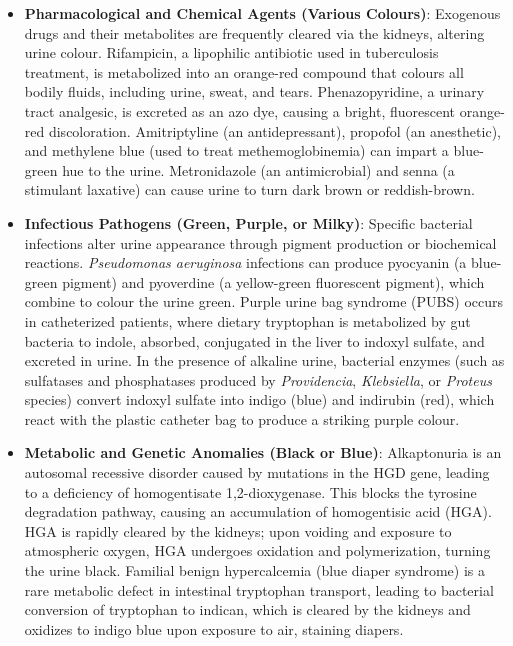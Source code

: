 \begin{itemize}
  \item \textbf{Pharmacological and Chemical Agents (Various Colours)}: Exogenous drugs and their metabolites are frequently cleared via the kidneys, altering urine colour. Rifampicin, a lipophilic antibiotic used in tuberculosis treatment, is metabolized into an orange-red compound that colours all bodily fluids, including urine, sweat, and tears. Phenazopyridine, a urinary tract analgesic, is excreted as an azo dye, causing a bright, fluorescent orange-red discoloration. Amitriptyline (an antidepressant), propofol (an anesthetic), and methylene blue (used to treat methemoglobinemia) can impart a blue-green hue to the urine. Metronidazole (an antimicrobial) and senna (a stimulant laxative) can cause urine to turn dark brown or reddish-brown.

  \item \textbf{Infectious Pathogens (Green, Purple, or Milky)}: Specific bacterial infections alter urine appearance through pigment production or biochemical reactions. \textit{Pseudomonas aeruginosa} infections can produce pyocyanin (a blue-green pigment) and pyoverdine (a yellow-green fluorescent pigment), which combine to colour the urine green. Purple urine bag syndrome (PUBS) occurs in catheterized patients, where dietary tryptophan is metabolized by gut bacteria to indole, absorbed, conjugated in the liver to indoxyl sulfate, and excreted in urine. In the presence of alkaline urine, bacterial enzymes (such as sulfatases and phosphatases produced by \textit{Providencia}, \textit{Klebsiella}, or \textit{Proteus} species) convert indoxyl sulfate into indigo (blue) and indirubin (red), which react with the plastic catheter bag to produce a striking purple colour.

  \item \textbf{Metabolic and Genetic Anomalies (Black or Blue)}: Alkaptonuria is an autosomal recessive disorder caused by mutations in the HGD gene, leading to a deficiency of homogentisate 1,2-dioxygenase. This blocks the tyrosine degradation pathway, causing an accumulation of homogentisic acid (HGA). HGA is rapidly cleared by the kidneys; upon voiding and exposure to atmospheric oxygen, HGA undergoes oxidation and polymerization, turning the urine black. Familial benign hypercalcemia (blue diaper syndrome) is a rare metabolic defect in intestinal tryptophan transport, leading to bacterial conversion of tryptophan to indican, which is cleared by the kidneys and oxidizes to indigo blue upon exposure to air, staining diapers.
\end{itemize}


